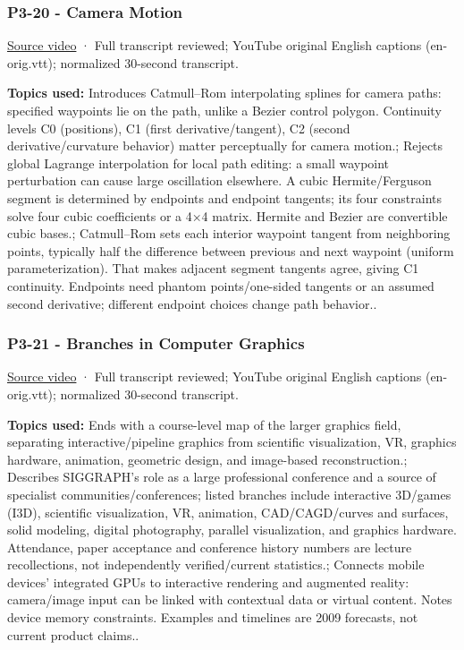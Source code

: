 \subsubsection{P3-20 - Camera Motion}\label{04-visual-computing-ii-ch036-p3-20---camera-motion}

\hypertarget{04-visual-computing-ii-ch036-p3-20---camera-motion}{}

\href{https://www.youtube.com/watch?v=HAJv25Afsz8}{Source video} · Full transcript reviewed; YouTube original English captions (en-orig.vtt); normalized 30-second transcript.

\textbf{Topics used:} Introduces Catmull--Rom interpolating splines for camera paths: specified waypoints lie on the path, unlike a Bezier control polygon. Continuity levels C0 (positions), C1 (first derivative/tangent), C2 (second derivative/curvature behavior) matter perceptually for camera motion.; Rejects global Lagrange interpolation for local path editing: a small waypoint perturbation can cause large oscillation elsewhere. A cubic Hermite/Ferguson segment is determined by endpoints and endpoint tangents; its four constraints solve four cubic coefficients or a 4×4 matrix. Hermite and Bezier are convertible cubic bases.; Catmull--Rom sets each interior waypoint tangent from neighboring points, typically half the difference between previous and next waypoint (uniform parameterization). That makes adjacent segment tangents agree, giving C1 continuity. Endpoints need phantom points/one-sided tangents or an assumed second derivative; different endpoint choices change path behavior..

\subsubsection{P3-21 - Branches in Computer Graphics}\label{04-visual-computing-ii-ch036-p3-21---branches-in-computer-graphics}

\hypertarget{04-visual-computing-ii-ch036-p3-21---branches-in-computer-graphics}{}

\href{https://www.youtube.com/watch?v=NEIJW3ZJ1GE}{Source video} · Full transcript reviewed; YouTube original English captions (en-orig.vtt); normalized 30-second transcript.

\textbf{Topics used:} Ends with a course-level map of the larger graphics field, separating interactive/pipeline graphics from scientific visualization, VR, graphics hardware, animation, geometric design, and image-based reconstruction.; Describes SIGGRAPH's role as a large professional conference and a source of specialist communities/conferences; listed branches include interactive 3D/games (I3D), scientific visualization, VR, animation, CAD/CAGD/curves and surfaces, solid modeling, digital photography, parallel visualization, and graphics hardware. Attendance, paper acceptance and conference history numbers are lecture recollections, not independently verified/current statistics.; Connects mobile devices' integrated GPUs to interactive rendering and augmented reality: camera/image input can be linked with contextual data or virtual content. Notes device memory constraints. Examples and timelines are 2009 forecasts, not current product claims..

